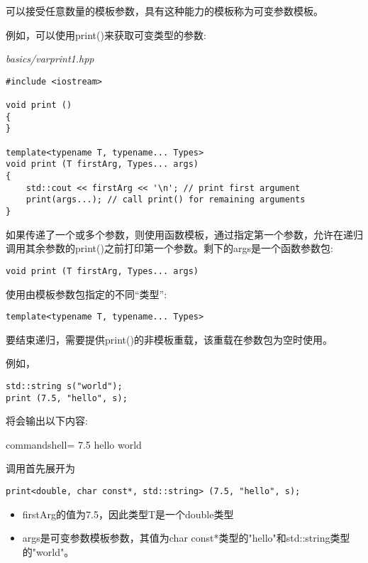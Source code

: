 

可以接受任意数量的模板参数，具有这种能力的模板称为可变参数模板。


例如，可以使用print()来获取可变类型的参数:

\noindent
\textit{basics/varprint1.hpp}
\begin{lstlisting}[style=styleCXX]
#include <iostream>

void print ()
{
}

template<typename T, typename... Types>
void print (T firstArg, Types... args)
{
	std::cout << firstArg << '\n'; // print first argument
	print(args...); // call print() for remaining arguments
}
\end{lstlisting}

如果传递了一个或多个参数，则使用函数模板，通过指定第一个参数，允许在递归调用其余参数的print()之前打印第一个参数。剩下的args是一个函数参数包:

\begin{lstlisting}[style=styleCXX]
void print (T firstArg, Types... args)
\end{lstlisting}

使用由模板参数包指定的不同“类型”:

\begin{lstlisting}[style=styleCXX]
template<typename T, typename... Types>
\end{lstlisting}

要结束递归，需要提供print()的非模板重载，该重载在参数包为空时使用。

例如，

\begin{lstlisting}[style=styleCXX]
std::string s("world");
print (7.5, "hello", s);
\end{lstlisting}

将会输出以下内容:

\begin{tcblisting}{commandshell={}}
7.5
hello
world
\end{tcblisting}

调用首先展开为

\begin{lstlisting}[style=styleCXX]
print<double, char const*, std::string> (7.5, "hello", s);
\end{lstlisting}

\begin{itemize}
\item 
firstArg的值为7.5，因此类型T是一个double类型

\item 
args是可变参数模板参数，其值为char const*类型的"hello"和std::string类型的"world"。
\end{itemize}

